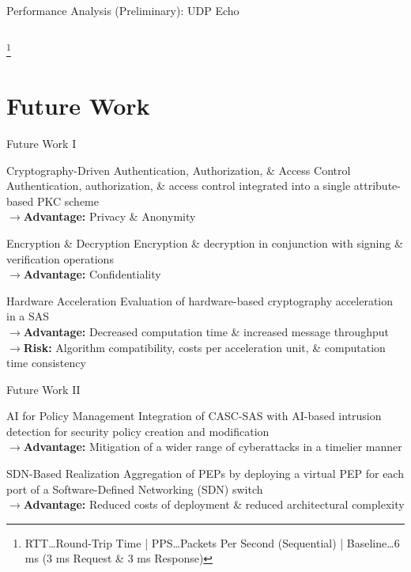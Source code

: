 \documentclass[en]{sdqbeamer}
\newcommand\nonumberfootnote[1]{%
  \begingroup
  \renewcommand\thefootnote{}\footnote{#1}%
  \addtocounter{footnote}{-1}%
  \endgroup
}
\begin{document}
\begin{frame}{Performance Analysis (Preliminary): UDP Echo}
\begin{columns}
    \end{columns}
    \nonumberfootnote{RTT\dots Round-Trip Time | PPS\dots Packets Per Second (Sequential) | Baseline\dots 6 ms (3 ms Request \& 3 ms Response)}
\end{frame}

\section{Future Work}
\begin{frame}{Future Work I}
    \begin{blueblock}{Cryptography-Driven Authentication, Authorization, \& Access Control}
        Authentication, authorization, \& access control integrated into a single attribute-based PKC scheme
        \\$\rightarrow$\textbf{Advantage:} Privacy \& Anonymity
    \end{blueblock}
    \begin{blueblock}{Encryption \& Decryption}
        Encryption \& decryption in conjunction with signing \& verification operations
        \\$\rightarrow$\textbf{Advantage:} Confidentiality
    \end{blueblock}
    \begin{blueblock}{Hardware Acceleration}
        Evaluation of hardware-based cryptography acceleration in a SAS
        \\$\rightarrow$\textbf{Advantage:} Decreased computation time \& increased message throughput
        \\$\rightarrow$\textbf{Risk:} Algorithm compatibility, costs per acceleration unit, \& computation time consistency
    \end{blueblock}
\end{frame}
\begin{frame}{Future Work II}
    \begin{blueblock}{AI for Policy Management}
        Integration of CASC-SAS with AI-based intrusion detection for security policy creation and modification
        \\$\rightarrow$\textbf{Advantage:} Mitigation of a wider range of cyberattacks in a timelier manner
    \end{blueblock}
    \begin{blueblock}{SDN-Based Realization}
        Aggregation of PEPs by deploying a virtual PEP for each port of a Software-Defined Networking (SDN) switch
        \\$\rightarrow$\textbf{Advantage:} Reduced costs of deployment \& reduced architectural complexity
    \end{blueblock}
\end{frame}
\end{document}

